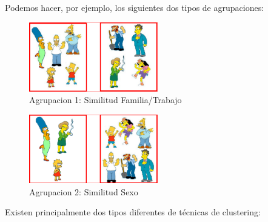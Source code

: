 \documentclass[a4paper, 11pt]{article} %
\begin{document}
Podemos hacer, por ejemplo, los siguientes dos tipos de agrupaciones:

\begin{figure}[H]
\centering
\includegraphics[width=0.5\textwidth]{Agrupacion1.PNG}
\caption{Agrupacion 1: Similitud Familia/Trabajo}
\label{Similitud Familia/Trabajo}
\end{figure}

\begin{figure}[H]
\centering
\includegraphics[width=0.5\textwidth]{Agrupacion2.PNG}
\caption{Agrupacion 2: Similitud Sexo}
\label{Similitud Sexo}
\end{figure}

Existen principalmente dos tipos diferentes de técnicas de clustering:
\end{document}
